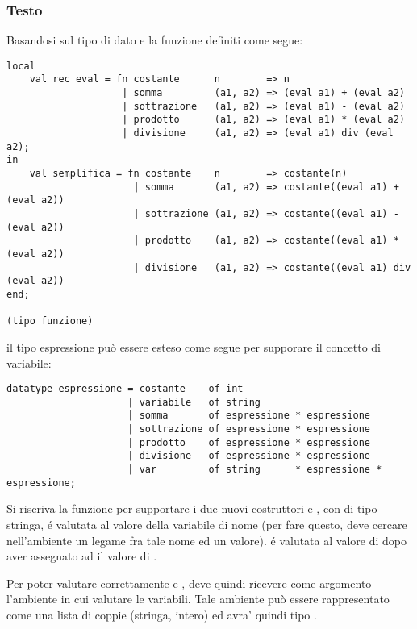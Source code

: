 \subsubsection{Testo}

Basandosi sul tipo di dato  e la funzione  definiti come segue:

\begin{lstlisting}[style = SML, caption = {Definizione della funzione \sml{semplifica}}]
local
	val rec eval = fn costante		n        => n
					| somma			(a1, a2) => (eval a1) + (eval a2)
					| sottrazione	(a1, a2) => (eval a1) - (eval a2)
					| prodotto		(a1, a2) => (eval a1) * (eval a2)
					| divisione		(a1, a2) => (eval a1) div (eval a2);
in
	val semplifica = fn costante	n        => costante(n)
					  | somma		(a1, a2) => costante((eval a1) + (eval a2))
					  | sottrazione	(a1, a2) => costante((eval a1) - (eval a2))
					  | prodotto	(a1, a2) => costante((eval a1) * (eval a2))
					  | divisione	(a1, a2) => costante((eval a1) div (eval a2))
end;

(tipo funzione)
\end{lstlisting}

il tipo espressione può essere esteso come segue per supporare il concetto di variabile:

\begin{lstlisting}[style = SML, caption = {Definizione del tipo di dato \sml{espressione}}]
datatype espressione = costante    of int
					 | variabile   of string
					 | somma       of espressione * espressione
					 | sottrazione of espressione * espressione
					 | prodotto    of espressione * espressione
					 | divisione   of espressione * espressione
					 | var         of string      * espressione * espressione;
\end{lstlisting}

Si riscriva la funzione  per supportare i due nuovi costruttori  e , con  di tipo stringa, é valutata al valore della variabile di nome  (per fare questo,  deve cercare nell'ambiente un legame fra tale nome ed un valore). %
 é valutata al valore di  dopo aver assegnato ad  il valore di .

\medskip
Per poter valutare correttamente  e ,  deve quindi ricevere come argomento l'ambiente in cui valutare le variabili. %
Tale ambiente può essere rappresentato come una lista di coppie (stringa, intero) ed avra' quindi tipo .

